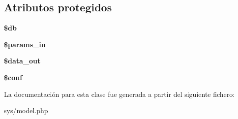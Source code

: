 \subsection*{Atributos protegidos}
\begin{DoxyCompactItemize}
\item 
\hypertarget{class_model_a1fa3127fc82f96b1436d871ef02be319}{}{\bfseries \$db}\label{class_model_a1fa3127fc82f96b1436d871ef02be319}

\item 
\hypertarget{class_model_a8586c72f15bcedb0c9654f311323dde8}{}{\bfseries \$params\+\_\+in}\label{class_model_a8586c72f15bcedb0c9654f311323dde8}

\item 
\hypertarget{class_model_a25a8fffc5cc934f9cacb4f0aa27d5512}{}{\bfseries \$data\+\_\+out}\label{class_model_a25a8fffc5cc934f9cacb4f0aa27d5512}

\item 
\hypertarget{class_model_ae4901046cc3e1deebf77ccc785384a78}{}{\bfseries \$conf}\label{class_model_ae4901046cc3e1deebf77ccc785384a78}

\end{DoxyCompactItemize}


La documentación para esta clase fue generada a partir del siguiente fichero\+:\begin{DoxyCompactItemize}
\item 
sys/model.\+php\end{DoxyCompactItemize}
